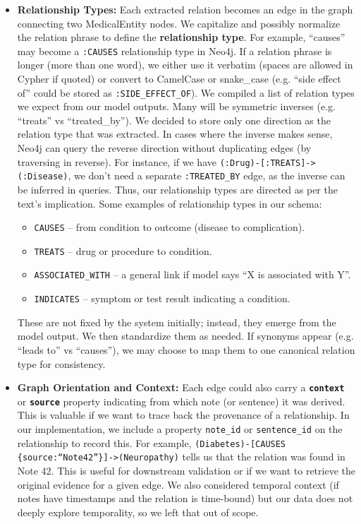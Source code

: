 \begin{itemize}
\item \textbf{Relationship Types:} Each extracted relation becomes an edge in the graph connecting two MedicalEntity nodes. We capitalize and possibly normalize the relation phrase to define the \textbf{relationship type}. For example, ``causes'' may become a \texttt{:CAUSES} relationship type in Neo4j. If a relation phrase is longer (more than one word), we either use it verbatim (spaces are allowed in Cypher if quoted) or convert to CamelCase or snake\_case (e.g. ``side effect of'' could be stored as \texttt{:SIDE\_EFFECT\_OF}). We compiled a list of relation types we expect from our model outputs. Many will be symmetric inverses (e.g. ``treats'' vs ``treated\_by''). We decided to store only one direction as the relation type that was extracted. In cases where the inverse makes sense, Neo4j can query the reverse direction without duplicating edges (by traversing in reverse). For instance, if we have \texttt{(:Drug)-[:TREATS]->(:Disease)}, we don't need a separate \texttt{:TREATED\_BY} edge, as the inverse can be inferred in queries. Thus, our relationship types are directed as per the text's implication. Some examples of relationship types in our schema:

  \begin{itemize}
  \item \texttt{CAUSES} – from condition to outcome (disease to complication).
  \item \texttt{TREATS} – drug or procedure to condition.
  \item \texttt{ASSOCIATED\_WITH} – a general link if model says ``X is associated with Y''.
  \item \texttt{INDICATES} – symptom or test result indicating a condition.
  \end{itemize}
  
  These are not fixed by the system initially; instead, they emerge from the model output. We then standardize them as needed. If synonyms appear (e.g. ``leads to'' vs ``causes''), we may choose to map them to one canonical relation type for consistency.

\item \textbf{Graph Orientation and Context:} Each edge could also carry a \textbf{\texttt{context}} or \textbf{\texttt{source}} property indicating from which note (or sentence) it was derived. This is valuable if we want to trace back the provenance of a relationship. In our implementation, we include a property \texttt{note\_id} or \texttt{sentence\_id} on the relationship to record this. For example, \texttt{(Diabetes)-[CAUSES \{source:``Note42''\}]->(Neuropathy)} tells us that the relation was found in Note 42. This is useful for downstream validation or if we want to retrieve the original evidence for a given edge. We also considered temporal context (if notes have timestamps and the relation is time-bound) but our data does not deeply explore temporality, so we left that out of scope.
\end{itemize}

